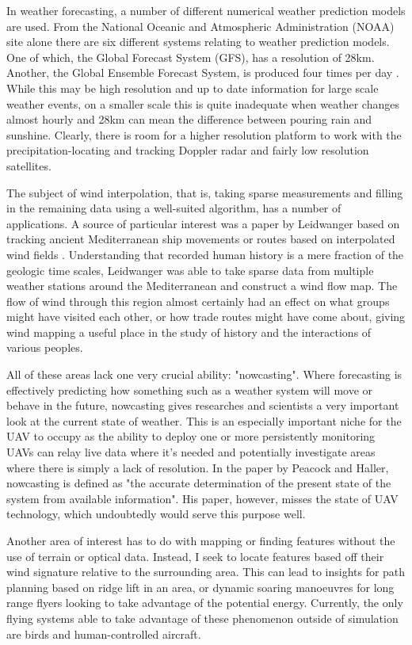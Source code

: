 \documentclass[12pt]{report}
\begin{document}
In weather forecasting, a number of different numerical weather prediction models are used. From the National Oceanic and Atmospheric Administration (NOAA) site alone there are six different systems relating to weather prediction models. One of which, the Global Forecast System (GFS), has a resolution of 28km. Another, the Global Ensemble Forecast System, is produced four times per day \cite{NOAA15}. While this may be high resolution and up to date information for large scale weather events, on a smaller scale this is quite inadequate when weather changes almost hourly and 28km can mean the difference between pouring rain and sunshine. Clearly, there is room for a higher resolution platform to work with the precipitation-locating and tracking Doppler radar and fairly low resolution satellites.

The subject of wind interpolation, that is, taking sparse measurements and filling in the remaining data using a well-suited algorithm, has a number of applications. A source of particular interest was a paper by Leidwanger based on tracking ancient Mediterranean ship movements or routes based on interpolated wind fields \cite{Leidwanger13}. Understanding that recorded human history is a mere fraction of the geologic time scales, Leidwanger was able to take sparse data from multiple weather stations around the Mediterranean and construct a wind flow map. The flow of wind through this region almost certainly had an effect on what groups might have visited each other, or how trade routes might have come about, giving wind mapping a useful place in the study of history and the interactions of various peoples. 

	All of these areas lack one very crucial ability: "nowcasting". Where forecasting is effectively predicting how something such as a weather system will move or behave in the future, nowcasting gives researches and scientists a very important look at the current state of weather. This is an especially important niche for the UAV to occupy as the ability to deploy one or more persistently monitoring UAVs can relay live data where it's needed and potentially investigate areas where there is simply a lack of resolution. In the paper by Peacock and Haller, nowcasting is defined as "the accurate determination of the present state of the system from available information"\cite{Peacock13}. His paper, however, misses the state of UAV technology, which undoubtedly would serve this purpose well.
	
Another area of interest has to do with mapping or finding features without the use of terrain or optical data. Instead, I seek to locate features based off their wind signature relative to the surrounding area. This can lead to insights for path planning based on ridge lift in an area, or dynamic soaring manoeuvres for long range flyers looking to take advantage of the potential energy. Currently, the only flying systems able to take advantage of these phenomenon outside of simulation are birds and human-controlled aircraft.
\end{document}

